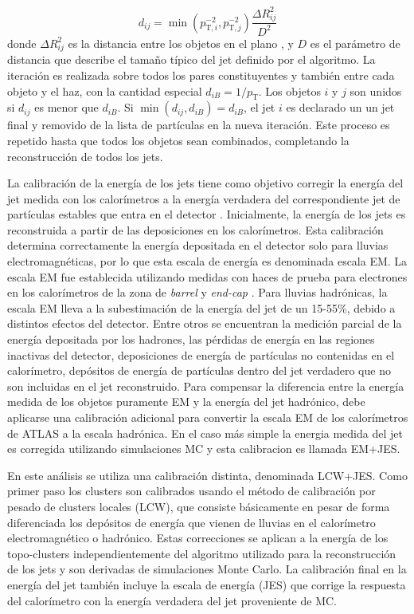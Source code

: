 \begin{equation}
  d_{ij} = \min(p_{\mathrm{T},i}^{-2}, p_{\mathrm{T},j}^{-2}) \frac{\Delta R_{ij}^2}{D^2}
\end{equation}
%
donde $\Delta R_{ij}^2$ es la distancia entre los objetos en el plano {\etaphi},
y $D$ es el parámetro de distancia que describe el tamaño típico del jet
definido por el algoritmo. La iteración es realizada sobre todos los pares
constituyentes y también entre cada objeto y el haz, con la cantidad especial
$d_{iB} = 1/p_{\mathrm{T}}$. Los objetos $i$ y $j$ son unidos si $d_{ij}$ es
menor que $d_{iB}$.
Si $\min(d_{ij}, d_{iB}) = d_{iB}$, el jet $i$ es declarado un un jet final y
removido de la lista de partículas en la nueva iteración. Este proceso es
repetido hasta que todos los objetos sean combinados, completando la
reconstrucción de todos los jets.

La calibración de la energía de los jets tiene como objetivo corregir la energía
del jet medida con los calorímetros a la energía verdadera del correspondiente
jet de partículas estables que entra en el detector \cite{Aad:2011he}. Inicialmente, la energía de
los jets es reconstruida a partir de las deposiciones en los calorímetros. Esta
calibración determina correctamente la energía depositada en el detector solo
para lluvias electromagnéticas, por lo que esta escala de energía es denominada escala
EM.
La escala EM fue establecida utilizando medidas con haces de prueba para
electrones en los calorímetros de la zona de \emph{barrel}
\cite{Abat:1900zz,Aharrouche:2010zz,Adragna:2009zz} y \emph{end-cap}
\cite{Pinfold:2008zzb,2004NIMPA.531..481C}.
Para lluvias hadrónicas, la escala EM lleva a la subestimación de la energía del
jet de un 15-55\%, debido a distintos efectos del detector. Entre otros se
encuentran la medición parcial de la energía depositada por los hadrones, las
pérdidas de energía en las regiones inactivas del detector, deposiciones de
energía de partículas no contenidas en el calorímetro, depósitos de energía de
partículas dentro del jet verdadero que no son incluidas en el jet reconstruido.
Para compensar la diferencia entre la energía medida de los objetos puramente EM
y la energía del jet hadrónico, debe aplicarse una calibración adicional para
convertir la escala EM de los calorímetros de ATLAS a la escala hadrónica.
En el caso más simple la energia medida del jet es corregida utilizando
simulaciones MC y esta calibracion es llamada EM+JES.

En este análisis se utiliza una calibración distinta, denominada LCW+JES. Como
primer paso los clusters son calibrados usando el método de calibración por
pesado de clusters locales (LCW), que consiste básicamente en pesar de forma
diferenciada los depósitos de energía que vienen de lluvias en el calorímetro
electromagnético o hadrónico. Estas correcciones se aplican a la energía de los
topo-clusters independientemente del algoritmo utilizado para la reconstrucción
de los jets y son derivadas de simulaciones Monte Carlo. La calibración final en
la energía del jet también incluye la escala de energía (JES) que corrige la
respuesta del calorímetro con la energía verdadera del jet proveniente de MC.

